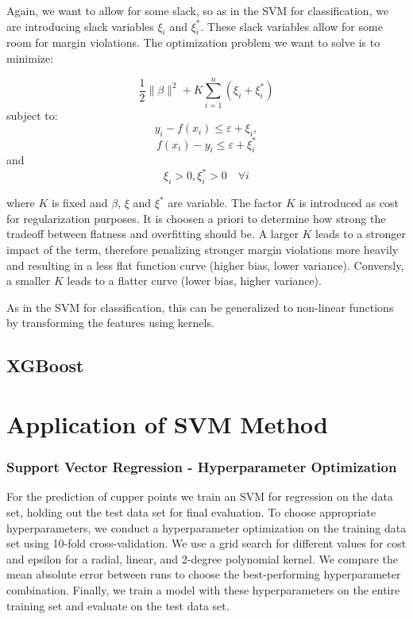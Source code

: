 \documentclass[
]{article}
\begin{document}
Again, we want to allow for some slack, so as in the SVM for
classification, we are introducing slack variables \(\xi_i\) and
\(\xi_i^\ast\). These slack variables allow for some room for margin
violations. The optimization problem we want to solve is to minimize:

\[
\frac{1}{2} \lVert \beta \rVert^2 + K \sum_{i=1}^n (\xi_i + \xi_i^\ast)
\] subject to: \[
y_i - f(x_i) \leq \varepsilon + \xi_i, 
\] \[
f(x_i) - y_i \leq \varepsilon + \xi_i^\ast
\] and \[
\xi_i > 0, \xi_i^\ast > 0 \quad \forall i
\]

where \(K\) is fixed and \(\beta\), \(\xi\) and \(\xi^\ast\) are
variable. The factor \(K\) is introduced as cost for regularization
purposes. It is choosen a priori to determine how strong the tradeoff
between flatness and overfitting should be. A larger \(K\) leads to a
stronger impact of the term, therefore penalizing stronger margin
violations more heavily and resulting in a less flat function curve
(higher bias, lower variance). Conversly, a smaller \(K\) leads to a
flatter curve (lower bias, higher variance).

As in the SVM for classification, this can be generalized to non-linear
functions by transforming the features using kernels.

\subsection{XGBoost}\label{xgboost}

\section{Application of SVM Method}\label{application-of-svm-method}

\subsubsection{Support Vector Regression - Hyperparameter
Optimization}\label{support-vector-regression---hyperparameter-optimization}

For the prediction of cupper points we train an SVM for regression on
the data set, holding out the test data set for final evaluation. To
choose appropriate hyperparameters, we conduct a hyperparameter
optimization on the training data set using 10-fold cross-validation. We
use a grid search for different values for cost and epsilon for a
radial, linear, and 2-degree polynomial kernel. We compare the mean
absolute error between runs to choose the best-performing hyperparameter
combination. Finally, we train a model with these hyperparameters on the
entire training set and evaluate on the test data set.
\end{document}
